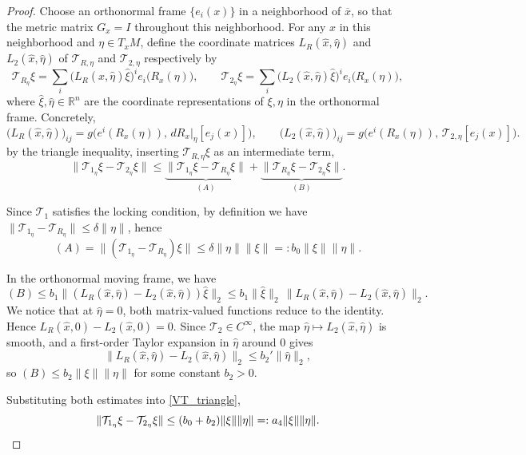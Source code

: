 \documentclass[12pt,a4paper,draft]{article}  %
\theoremstyle{definition}
\numberwithin{equation}{section}
\newcommand{\VT}{\mathcal{T}}
\begin{document}
\begin{proof}
        Choose an orthonormal frame $\{e_i(x)\}$ in a neighborhood of $\overline{x}$, so that the metric matrix $G_x = I$ throughout this neighborhood. For any $x$ in this neighborhood and $\eta \in T_x M$, define the coordinate matrices $L_R(\hat{x}, \hat{\eta})$ and $L_2(\hat{x}, \hat{\eta})$ of $\VT_{R,\eta}$ and $\VT_{2,\eta}$ respectively by
        \[
                \VT_{R_\eta}\xi = \sum_i \bigl(L_R(\hat{x},\hat{\eta})\hat{\xi}\bigr)^i e_i\bigl(R_x(\eta)\bigr), \qquad
                \VT_{2_\eta}\xi = \sum_i \bigl(L_2(\hat{x},\hat{\eta})\hat{\xi}\bigr)^i e_i\bigl(R_x(\eta)\bigr),
        \]
        where $\hat{\xi}, \hat{\eta} \in \mathbb{R}^n$ are the coordinate representations of $\xi, \eta$ in the orthonormal frame. Concretely,
        \[
                \bigl(L_R(\hat{x},\hat{\eta})\bigr)_{ij} = g\bigl(e^i(R_x(\eta)),\, dR_x\big|_\eta[e_j(x)]\bigr), \qquad
                \bigl(L_2(\hat{x},\hat{\eta})\bigr)_{ij} = g\bigl(e^i(R_x(\eta)),\, \VT_{2,\eta}[e_j(x)]\bigr).
        \]
        by the triangle inequality, inserting $\VT_{R,\eta}\xi$ as an intermediate term,
        \begin{equation}\label{VT_triangle}
                \|\VT_{1_\eta}\xi - \VT_{2_\eta}\xi\| \leq \underbrace{\|\VT_{1_\eta}\xi - \VT_{R_\eta}\xi\|}_{(A)} + \underbrace{\|\VT_{R_\eta}\xi - \VT_{2_\eta}\xi\|}_{(B)}.
        \end{equation}

        Since $\VT_1$ satisfies the locking condition, by definition we have $\|\VT_{1_\eta} - \VT_{R_\eta}\| \leq \delta\|\eta\|$, hence
        \[
                (A) = \|(\VT_{1_\eta} - \VT_{R_\eta})\xi\| \leq \delta\|\eta\|\|\xi\| =: b_0\|\xi\|\|\eta\|.
        \]

        In the orthonormal moving frame, we have
        \[
                (B) \leq b_1 \|(L_R(\hat{x},\hat{\eta}) - L_2(\hat{x},\hat{\eta}))\hat{\xi}\|_2 \leq b_1\|\hat{\xi}\|_2\,\|L_R(\hat{x},\hat{\eta}) - L_2(\hat{x},\hat{\eta})\|_2.
        \]
        We notice that at $\hat{\eta} = 0$, both matrix-valued functions reduce to the identity. Hence $L_R(\hat{x},0) - L_2(\hat{x},0) = 0$. Since $\VT_2 \in C^\infty$, the map $\hat{\eta} \mapsto L_2(\hat{x},\hat{\eta})$ is smooth, and a first-order Taylor expansion in $\hat{\eta}$ around $0$ gives
        \[
                \|L_R(\hat{x},\hat{\eta}) - L_2(\hat{x},\hat{\eta})\|_2 \leq b_2'\|\hat{\eta}\|_2,
        \]
        so $(B) \leq b_2\|\xi\|\|\eta\|$ for some constant $b_2 > 0$.

        Substituting both estimates into \eqref{VT_triangle},
        \[
                \|\VT_{1_\eta}\xi - \VT_{2_\eta}\xi\| \leq (b_0 + b_2)\|\xi\|\|\eta\| =: a_4\|\xi\|\|\eta\|. \qedhere
        \]
\end{proof}
\end{document}
